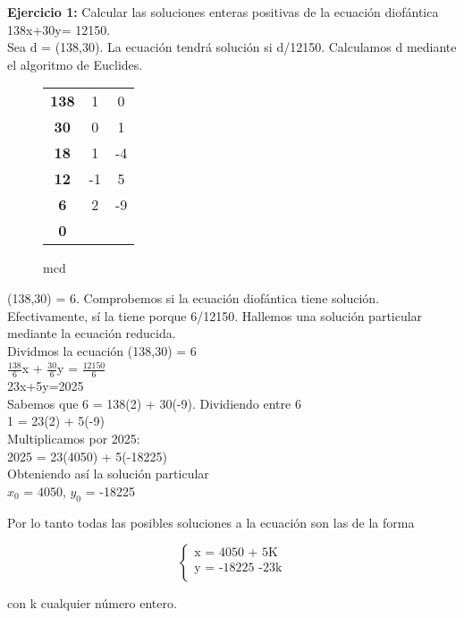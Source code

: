 \documentclass[13pt]{article}
\begin{document}
\textbf{Ejercicio 1:} Calcular las soluciones enteras positivas de la ecuación diofántica 138x+30y= 12150.\\

Sea d = (138,30). La ecuación tendrá solución si d/12150. Calculamos d mediante el algoritmo de Euclides.

\begin{figure}[H]
\begin{center}
\caption{mcd}
\label{my-label}
\begin{tabular}[(b)]{|c|cc}
\cline{1-1}
\textbf{138} & 1                    & 0                    \\ \cline{1-1}
\textbf{30}  & 0                    & 1                    \\ \cline{1-1}
\textbf{18}  & 1                    & -4                   \\ \cline{1-1}
\textbf{12}  & -1                   & 5                    \\ \cline{1-1}
\textbf{6}  & 2                    & -9                    \\ \cline{1-1}
\textbf{0}           & \multicolumn{1}{l}{} & \multicolumn{1}{l}{} \\ \cline{1-1}
\end{tabular}
\end{center}
\end{figure}

(138,30) = 6. Comprobemos si la ecuación diofántica tiene solución. Efectivamente, sí la tiene porque 6/12150. Hallemos una solución particular mediante la ecuación reducida.
 \\
 
Dividmos la ecuación (138,30) = 6
\\


$\frac{138}{6}$x + $\frac{30}{6}$y = $\frac{12150}{6}$
 \\

23x+5y=2025
 \\

Sabemos que 6 = 138(2) + 30(-9). Dividiendo entre 6
\\

 
1 = 23(2) + 5(-9)
 \\
 
Multiplicamos por 2025:
 \\
 
2025 = 23(4050) + 5(-18225)
 \\

Obteniendo así la solución particular 
 \\
 

$x_{0}$ = 4050, $y_{0}$ = -18225

Por lo tanto todas las posibles soluciones a la ecuación son las de la forma

\[
	\begin{cases}
	\text{x = 4050 + 5K}\\
	\text{y = -18225 -23k}\\
	\end{cases}
\]

con k cualquier número entero.
\end{document}
